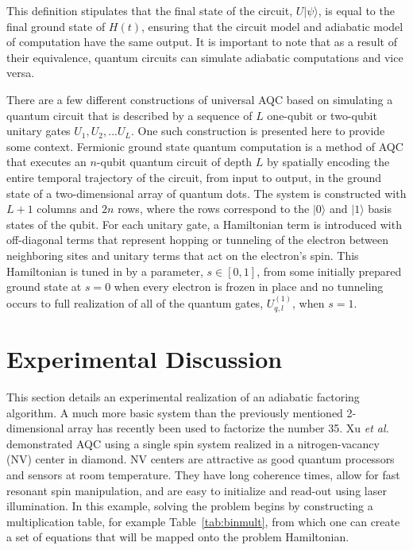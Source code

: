 \documentclass[%
 reprint,
 amsmath,amssymb,
 aps,
]{revtex4-1}
\begin{document}
   This definition stipulates that the final state of the circuit, $U\vert\psi\rangle$, is equal to the final ground state of $H(t)$, ensuring that the circuit model and adiabatic model of computation have the same output. It is important to note that as a result of their equivalence, quantum circuits can simulate adiabatic computations\cite{Farhi2000} and vice versa\cite{Aharanov2007}.
   
   There are a few different constructions of universal AQC based on simulating a quantum circuit that is described by a sequence of $L$ one-qubit or two-qubit unitary gates $U_1 , U_2 , ... U_L$. One such construction is presented here to provide some context. Fermionic ground state quantum computation is a method of AQC that executes an $n$-qubit quantum circuit of depth $L$ by spatially encoding the entire temporal trajectory of the circuit, from input to output, in the ground state of a two-dimensional array of quantum dots\cite{Mizel2001}. The system is constructed with $L+1$ columns and $2n$ rows, where the rows correspond to the $\vert 0 \rangle$ and $\vert 1 \rangle$ basis states of the qubit. For each unitary gate, a Hamiltonian term is introduced with off-diagonal terms that represent hopping or tunneling of the electron between neighboring sites and unitary terms that act on the electron's spin. This Hamiltonian is tuned in by a parameter, $s \in [0,1]$, from some initially prepared ground state at $s=0$ when every electron is frozen in place and no tunneling occurs to full realization of all of the quantum gates, $U^{(1)}_{q,l}$, when $s=1$.
   
   \section{Experimental Discussion}\label{sec:B}
   
   This section details an experimental realization of an adiabatic factoring algorithm. A much more basic system than the previously mentioned 2-dimensional array has recently been used to factorize the number 35\cite{Xu2017}. Xu \textit{et al.} demonstrated AQC using a single spin system realized in a nitrogen-vacancy (NV) center in diamond. NV centers are attractive as good quantum processors and sensors at room temperature\cite{DOHERTY20131}. They have long coherence times, allow for fast resonant spin manipulation, and are easy to initialize and read-out using laser illumination. In this example, solving the problem begins by constructing a multiplication table, for example Table~\ref{tab:binmult}, from which one can create a set of equations that will be mapped onto the problem Hamiltonian.
   
\end{document}
